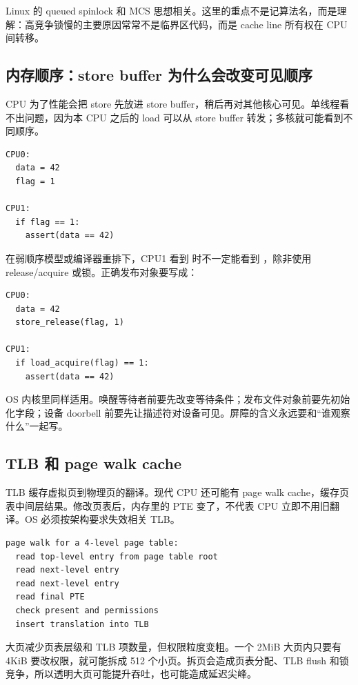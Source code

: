 Linux 的 queued spinlock 和 MCS 思想相关。这里的重点不是记算法名，而是理解：高竞争锁慢的主要原因常常不是临界区代码，而是 cache line 所有权在 CPU 间转移。

\subsection{内存顺序：store buffer 为什么会改变可见顺序}

CPU 为了性能会把 store 先放进 store buffer，稍后再对其他核心可见。单线程看不出问题，因为本 CPU 之后的 load 可以从 store buffer 转发；多核就可能看到不同顺序。

\begin{lstlisting}
CPU0:
  data = 42
  flag = 1

CPU1:
  if flag == 1:
    assert(data == 42)
\end{lstlisting}

在弱顺序模型或编译器重排下，CPU1 看到  时不一定能看到 ，除非使用 release/acquire 或锁。正确发布对象要写成：

\begin{lstlisting}
CPU0:
  data = 42
  store_release(flag, 1)

CPU1:
  if load_acquire(flag) == 1:
    assert(data == 42)
\end{lstlisting}

OS 内核里同样适用。唤醒等待者前要先改变等待条件；发布文件对象前要先初始化字段；设备 doorbell 前要先让描述符对设备可见。屏障的含义永远要和“谁观察什么”一起写。

\subsection{TLB 和 page walk cache}

TLB 缓存虚拟页到物理页的翻译。现代 CPU 还可能有 page walk cache，缓存页表中间层结果。修改页表后，内存里的 PTE 变了，不代表 CPU 立即不用旧翻译。OS 必须按架构要求失效相关 TLB。

\begin{lstlisting}
page walk for a 4-level page table:
  read top-level entry from page table root
  read next-level entry
  read next-level entry
  read final PTE
  check present and permissions
  insert translation into TLB
\end{lstlisting}

大页减少页表层级和 TLB 项数量，但权限粒度变粗。一个 2MiB 大页内只要有 4KiB 要改权限，就可能拆成 512 个小页。拆页会造成页表分配、TLB flush 和锁竞争，所以透明大页可能提升吞吐，也可能造成延迟尖峰。

